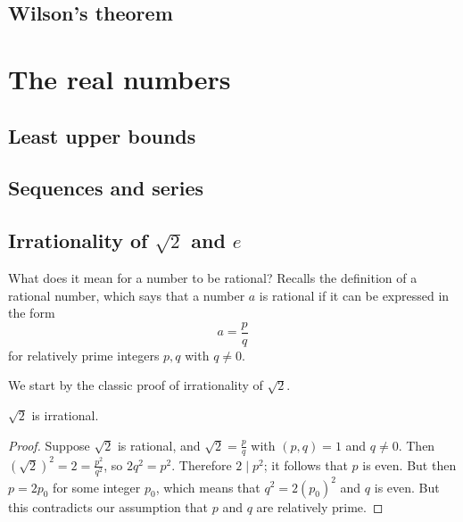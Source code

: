\documentclass[main.tex]{subfiles}
\begin{document}
		\subsection{Wilson's theorem}
		
	\section{The real numbers}
		\subsection{Least upper bounds}
		
		\subsection{Sequences and series}
		
		\subsection{Irrationality of $\sqrt{2}$ and $e$}
		What does it mean for a number to be rational? Recalls the definition of a rational number, which says that a number $a$ is rational if it can be expressed in the form
		\begin{equation*}
			a = \frac{p}{q}
		\end{equation*}
		for relatively prime integers $p, q$ with $q \neq 0$.
		
		We start by the classic proof of irrationality of $\sqrt{2}$.
		\begin{theorem}
			$\sqrt{2}$ is irrational.
		\end{theorem}
		\begin{proof}
			Suppose $\sqrt{2}$ is rational, and $\sqrt{2} = \frac{p}{q}$ with $(p, q) = 1$ and $q \neq 0$. Then $(\sqrt{2})^2 = 2 = \frac{p^2}{q^2}$, so $2q^2 = p^2$. Therefore $2 \mid p^2$; it follows that $p$ is even. But then $p = 2p_0$ for some integer $p_0$, which means that $q^2 = 2{(p_0)}^2$ and $q$ is even. But this contradicts our assumption that $p$ and $q$ are relatively prime.
		\end{proof}
	
\end{document}
